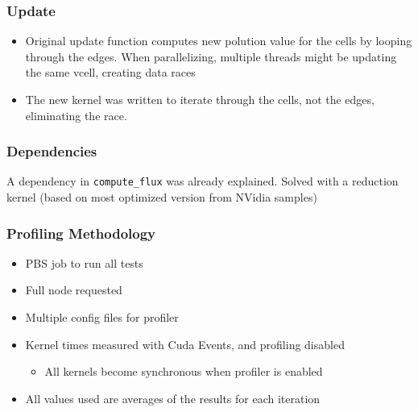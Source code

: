 \documentclass{beamer}
\begin{document}
\begin{frame}
	\frametitle{Update}

	\begin{itemize}
		\item[] Original update function computes new polution value for the cells by looping through the edges. When parallelizing, multiple threads might be updating the same vcell, creating data races
		\item[] The new kernel was written to iterate through the cells, not the edges, eliminating the race.
	\end{itemize}
\end{frame}


\begin{frame}
	\frametitle{Dependencies}

	A dependency in \texttt{compute\_flux} was already explained.
	Solved with a reduction kernel (based on most optimized version from NVidia samples)

\end{frame}

\begin{frame}
	\frametitle{Profiling Methodology}

	\begin{itemize}
		\item PBS job to run all tests
		\item Full node requested
		\item Multiple config files for profiler
		\item Kernel times measured with Cuda Events, and profiling disabled
		\begin{itemize}
			\item All kernels become synchronous when profiler is enabled
		\end{itemize}
		\item All values used are averages of the results for each iteration
	\end{itemize}
\end{frame}
\end{document}
